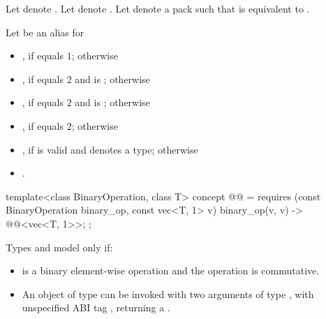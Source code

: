 \begin{itemdescr}
\pnum
Let  denote .
Let  denote .
Let  denote a pack such that  is equivalent
to .

\pnum
Let  be an alias for
\begin{itemize}
 \item
   , if  equals $1$;
   otherwise
 \item
   , if  equals $2$ and
    is ; otherwise
 \item
   , if
    equals $2$ and
   is ; otherwise
 \item
   , if
    equals $2$; otherwise
 \item
   , if
    is valid and denotes a type;
   otherwise
 \item
   .
\end{itemize}
\end{itemdescr}

\begin{itemdecl}
template<class BinaryOperation, class T>
  concept @@ =
    requires (const BinaryOperation binary_op, const vec<T, 1> v) {
      { binary_op(v, v) } -> @@<vec<T, 1>>;
    };
\end{itemdecl}

\begin{itemdescr}
\pnum
Types  and  model
 only if:
\begin{itemize}
\item {} is a binary element-wise operation and the
operation is commutative.

\item An object of type  can be invoked with two
arguments of type , with unspecified ABI tag
, returning a .
\end{itemize}
\end{itemdescr}

